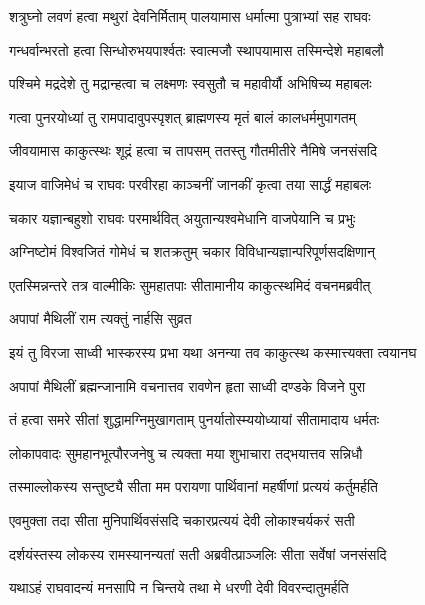 \twolineshloka
{शत्रुघ्नो लवणं हत्वा मथुरां देवनिर्मिताम्}
{पालयामास धर्मात्मा पुत्राभ्यां सह राघवः}%

\twolineshloka
{गन्धर्वान्भरतो हत्वा सिन्धोरुभयपार्श्वतः}
{स्वात्मजौ स्थापयामास तस्मिन्देशे महाबलौ}%

\twolineshloka
{पश्चिमे मद्रदेशे तु मद्रान्हत्वा च लक्ष्मणः}
{स्वसुतौ च महावीर्यौ अभिषिच्य महाबलः}%

\twolineshloka
{गत्वा पुनरयोध्यां तु रामपादावुपस्पृशत्}
{ब्राह्मणस्य मृतं बालं कालधर्ममुपागतम्}%

\twolineshloka
{जीवयामास काकुत्स्थः शूद्रं हत्वा च तापसम्}
{ततस्तु गौतमीतीरे नैमिषे जनसंसदि}%

\twolineshloka
{इयाज वाजिमेधं च राघवः परवीरहा}
{काञ्चनीं जानकीं कृत्वा तया सार्द्धं महाबलः}%

\twolineshloka
{चकार यज्ञान्बहुशो राघवः परमार्थवित्}
{अयुतान्यश्वमेधानि वाजपेयानि च प्रभुः}%

\twolineshloka
{अग्निष्टोमं विश्वजितं गोमेधं च शतक्रतुम्}
{चकार विविधान्यज्ञान्परिपूर्णसदक्षिणान्}%

\twolineshloka
{एतस्मिन्नन्तरे तत्र वाल्मीकिः सुमहातपाः}
{सीतामानीय काकुत्स्थमिदं वचनमब्रवीत्}%


अपापां मैथिलीं राम त्यक्तुं नार्हसि सुव्रत

\twolineshloka
{इयं तु विरजा साध्वी भास्करस्य प्रभा यथा}
{अनन्या तव काकुत्स्थ कस्मात्त्यक्ता त्वयानघ}%


\twolineshloka
{अपापां मैथिलीं ब्रह्मन्जानामि वचनात्तव}
{रावणेन हृता साध्वी दण्डके विजने पुरा}%

\twolineshloka
{तं हत्वा समरे सीतां शुद्धामग्निमुखागताम्}
{पुनर्यातोस्म्ययोध्यायां सीतामादाय धर्मतः}%

\twolineshloka
{लोकापवादः सुमहानभूत्पौरजनेषु च}
{त्यक्ता मया शुभाचारा तद्भयात्तव सन्निधौ}%

\twolineshloka
{तस्माल्लोकस्य सन्तुष्ट्यै सीता मम परायणा}
{पार्थिवानां महर्षीणां प्रत्ययं कर्तुमर्हति}%


\twolineshloka
{एवमुक्ता तदा सीता मुनिपार्थिवसंसदि}
{चकारप्रत्ययं देवी लोकाश्चर्यकरं सती}%

\twolineshloka
{दर्शयंस्तस्य लोकस्य रामस्यानन्यतां सती}
{अब्रवीत्प्राञ्जलिः सीता सर्वेषां जनसंसदि}%


\twolineshloka
{यथाऽहं राघवादन्यं मनसापि न चिन्तये}
{तथा मे धरणी देवी विवरन्दातुमर्हति}%

